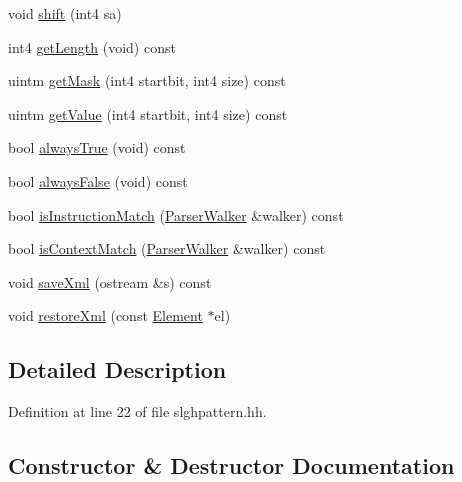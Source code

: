 \begin{DoxyCompactItemize}
\item 
void \mbox{\hyperlink{class_pattern_block_ab159a1b0a1f22b8aae4bf17666a38aea}{shift}} (int4 sa)
\item 
int4 \mbox{\hyperlink{class_pattern_block_acf2619fb7613d032fc3ff61a9e84c0d5}{get\+Length}} (void) const
\item 
uintm \mbox{\hyperlink{class_pattern_block_a8e4dd2db9cdde4ebb3d602cdeefefd79}{get\+Mask}} (int4 startbit, int4 size) const
\item 
uintm \mbox{\hyperlink{class_pattern_block_ae890f0389a7467fedaf982a27fbb84c9}{get\+Value}} (int4 startbit, int4 size) const
\item 
bool \mbox{\hyperlink{class_pattern_block_aa891af56e7ea4582f0afb6d32efead2b}{always\+True}} (void) const
\item 
bool \mbox{\hyperlink{class_pattern_block_ad5ce02e816a42c5278db7580fbc29bb5}{always\+False}} (void) const
\item 
bool \mbox{\hyperlink{class_pattern_block_a64c44360ffff4e4b508d5b1ac0f7b9a2}{is\+Instruction\+Match}} (\mbox{\hyperlink{class_parser_walker}{Parser\+Walker}} \&walker) const
\item 
bool \mbox{\hyperlink{class_pattern_block_a3ea9defadd1e8f6a1e5744883ed9859e}{is\+Context\+Match}} (\mbox{\hyperlink{class_parser_walker}{Parser\+Walker}} \&walker) const
\item 
void \mbox{\hyperlink{class_pattern_block_ab0e34b5b191eaa74314a70762f1530fc}{save\+Xml}} (ostream \&s) const
\item 
void \mbox{\hyperlink{class_pattern_block_aa4465b1b7c1fa2f15d04ac74be36b21f}{restore\+Xml}} (const \mbox{\hyperlink{class_element}{Element}} $\ast$el)
\end{DoxyCompactItemize}


\subsection{Detailed Description}


Definition at line 22 of file slghpattern.\+hh.



\subsection{Constructor \& Destructor Documentation}
\mbox{\label{class_pattern_block_ab0ed5919982064e8399c19997d8b7225}} 
